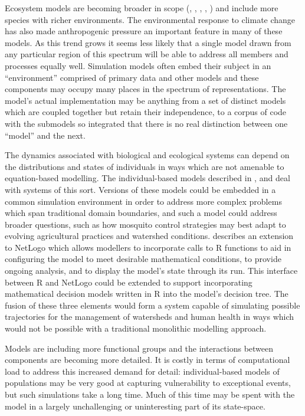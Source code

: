 Ecosystem models are becoming broader in scope (\citet{Rose10:1},
\citet{DeAngelis98:1}, \citet{Harvey03:1} \citet{Fulton04:1}, \citet{Gray06:1},
\citet{Ningaloo:1}) and include more species with richer environments. The
environmental response to climate change has also made anthropogenic pressure
an important feature in many of these models. As this trend grows it seems
less likely that a single model drawn from any particular region of this
spectrum will be able to address all members and processes equally well.
Simulation models often embed their subject in an ``environment'' comprised of
primary data and other models and these components may occupy many places in
the spectrum of representations. The model's actual implementation may be
anything from a set of distinct models which are coupled together but retain
their independence, to a corpus of code with the submodels so integrated that
there is no real distinction between one ``model'' and the next.

The dynamics associated with biological and ecological systems can depend on
the distributions and states of individuals in ways which are not amenable to
equation-based modelling. The individual-based models described in
\citet{Farolfi2010}, and \citet{Almeida2010} deal with systems of this sort.
Versions of these models could be embedded in a common simulation environment
in order to address more complex problems which span traditional domain
boundaries, and such a model could address broader questions, such as how
mosquito control strategies may best adapt to evolving agricultural practices
and watershed conditions.  describes an extension to NetLogo
which allows modellers to incorporate calls to R functions to aid in
configuring the model to meet desirable mathematical conditions, to provide
ongoing analysis, and to display the model's state through its run. This
interface between R and NetLogo could be extended to support incorporating
mathematical decision models written in R into the model's decision tree. The
fusion of these three elements would form a system capable of simulating
possible trajectories for the management of watersheds and human health in
ways which would not be possible with a traditional monolithic modelling
approach.

Models are including more functional groups and the interactions between
components are becoming more detailed. It is costly in terms of computational
load to address this increased demand for detail: individual-based models of
populations may be very good at capturing vulnerability to exceptional events,
but such simulations take a long time. Much of this time may be spent with the
model in a largely unchallenging or uninteresting part of its state-space.

